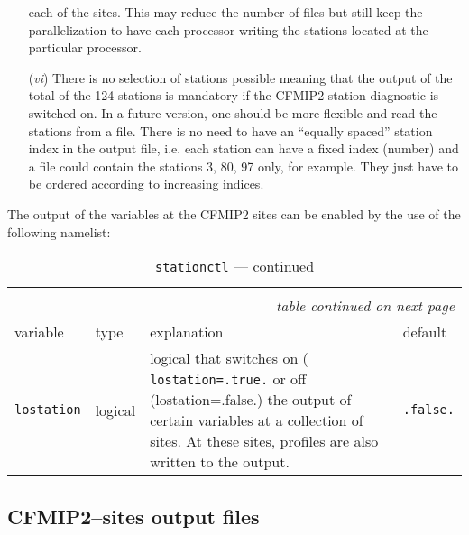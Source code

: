 \begin{appendix}
\begin{itemize}
  each of the sites. This may reduce the number of files but still
  keep the parallelization to have each processor writing the stations
  located at the particular processor.
\item[({\it vi}\/)] There is no selection of stations possible meaning
  that the output of the total of the 124 stations is mandatory if the
  CFMIP2 station diagnostic is switched on. In a future version, one
  should be more flexible and read the stations from a file. There is
  no need to have an ``equally spaced'' station index in the output
  file, i.e. each station can have a fixed index (number) and a file
  could contain the stations 3, 80, 97 only, for example. They just
  have to be ordered according to increasing indices.  
\end{itemize}

The output of the variables at the CFMIP2 sites can be enabled by the
use of the following namelist:

\setlength{\LTcapwidth}{\textwidth}
\setlength{\LTleft}{0pt}\setlength{\LTright}{0pt}

\begin{longtable}{l@{\extracolsep\fill}lp{5.0cm}p{3.0cm}}
\hline\hline\caption[Namelist {\tt stationctl}]{Namelist
  {\tt stationctl}}\\\hline\label{tabstationctl}
\endfirsthead
\caption[]{{\tt stationctl} --- continued}\\\hline
\endhead
\hline\multicolumn{4}{r}{\slshape table continued on next page}\\
\endfoot
\hline %
\endlastfoot
variable & type & explanation & default \\\hline
{\tt lostation} & logical & logical that switches on ({\tt
  lostation=.true.} or off (lostation=.false.) the output of certain
\echam{} variables at a collection of sites. At these sites, profiles
are also written to the output. & {\tt .false.}\\
\hline 
\end{longtable}

\subsection{CFMIP2--sites output files}


\end{appendix}
